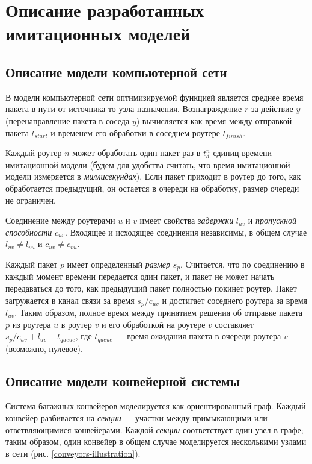 \documentclass[specification, annotation]{itmo-student-thesis}
\begin{document}
\chapter{Описание разработанных имитационных моделей}\label{apx:simulators}

\section{Описание модели компьютерной сети}\label{apx:network-model}

В модели компьютерной сети оптимизируемой функцией является среднее время пакета в
пути от источника то узла назначения. Вознаграждение $r$ за действие $y$
(перенаправление пакета в соседа $y$) вычисляется как время между отправкой
пакета $t_{start}$ и временем его обработки в соседнем роутере $t_{finish}$.

Каждый роутер $n$ может обработать один пакет раз в $t_d^n$ единиц времени имитационной
модели (будем для удобства считать, что время имитационной модели измеряется в
\textit{миллисекундах}). Если пакет приходит в роутер до того, как обработается
предыдущий, он остается в очереди на обработку, размер очереди не ограничен.

Соединение между роутерами $u$ и $v$ имеет свойства \textit{задержки} $l_{uv}$ и
\textit{пропускной способности} $c_{uv}$. Входящее и исходящее соединения
независимы, в общем случае $l_{uv} \neq l_{vu}$ и $c_{uv} \neq c_{vu}$.

Каждый пакет $p$ имеет определенный \textit{размер} $s_p$.
Считается, что по соединению в каждый момент времени передается один пакет, и
пакет не может начать передаваться до того, как предыдущий пакет полностью
покинет роутер. Пакет загружается в канал связи за время $s_p / c_{uv}$ и
достигает соседнего роутера за время $l_{uv}$. Таким образом, полное время между
принятием решения об отправке пакета $p$ из роутера $u$ в роутер $v$ и его
обработкой на роутере $v$ составляет $s_p / c_{uv} + l_{uv} + t_{queue}$, где
$t_{queue}$ --- время ожидания пакета в очереди роутера $v$ (возможно, нулевое).

\section{Описание модели конвейерной системы}\label{apx:conveyor-model}

Система багажных конвейеров моделируется как ориентированный граф. Каждый
конвейер разбивается на \textit{секции} --- участки между примыкающими или
ответвляющимися конвейерами. Каждой \textit{секции} соответствует один узел в
графе; таким образом, один конвейер в общем случае моделируется несколькими
узлами в сети (рис. \ref{conveyors-illustration}).
\end{document}
